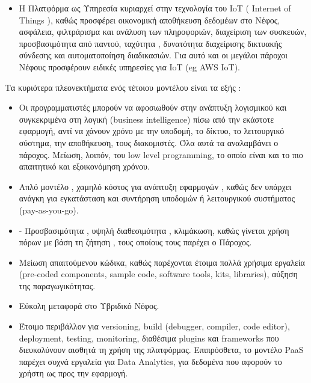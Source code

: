 \documentclass{article}
\begin{document}
\begin{itemize}
\item Η Πλατφόρμα ως Υπηρεσία κυριαρχεί στην τεχνολογία του IoT ( Internet of Things ), καθώς προσφέρει οικονομική αποθήκευση δεδομέων στο Νέφος, ασφάλεια, φιλτράρισμα και ανάλυση των πληροφοριών, διαχείριση των συσκευών, προσβασιμότητα από παντού, ταχύτητα , δυνατότητα διαχείρισης δικτυακής σύνδεσης και αυτοματοποίηση διαδικασιών. Για αυτό και οι μεγάλοι πάροχοι Νέφους προσφέρουν ειδικές υπηρεσίες για IoT (eg AWS IoT).
\end{itemize}
Τα κυριότερα πλεονεκτήματα ενός τέτοιου μοντέλου είναι τα εξής :
\begin{itemize}
\item Οι προγραμματιστές μπορούν να αφοσιωθούν στην ανάπτυξη λογισμικού και συγκεκριμένα στη λογική (business intelligence) πίσω από την εκάστοτε εφαρμογή, αντί να χάνουν χρόνο με την υποδομή, το δίκτυο, το λειτουργικό σύστημα, την αποθήκευση, τους διακομιστές. Όλα αυτά τα αναλαμβάνει ο πάροχος. Μείωση, λοιπόν, του low level  programming, το οποίο είναι και το πιο απαιτητικό και εξοικονόμηση χρόνου.
\item Απλό μοντέλο , χαμηλό κόστος για ανάπτυξη εφαρμογών , καθώς δεν υπάρχει ανάγκη για εγκατάσταση και συντήρηση υποδομών ή λειτουργικού συστήματος  (pay-as-you-go).
\item-	Προσβασιμότητα , υψηλή διαθεσιμότητα , κλιμάκωση, καθώς γίνεται χρήση πόρων με βάση τη ζήτηση , τους οποίους τους παρέχει ο Πάροχος.
\item Μείωση απαιτούμενου κώδικα, καθώς παρέχονται έτοιμα πολλά χρήσιμα εργαλεία (pre-coded components, sample code, software tools, kits, libraries), αύξηση της παραγωγικότητας.
\item Εύκολη μεταφορά στο Υβριδικό Νέφος.
\item Έτοιμο περιβάλλον για versioning, build (debugger, compiler, code editor), deployment, testing, monitoring, διαθέσιμα plugins και frameworks που διευκολύνουν αισθητά τη χρήση της πλατφόρμας. Επιπρόσθετα,  το μοντέλο PaaS παρέχει συχνά εργαλεία για Data Analytics, για δεδομένα που αφορούν το χρήστη ως προς την εφαρμογή.

\end{itemize}
\end{document}
